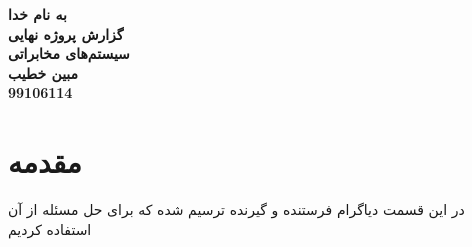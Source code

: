 

\begin{titlepage}
\begin{center}

\Huge
\textbf{به نام خدا}\\[2cm]

\huge
\textbf{گزارش پروژه نهایی }\\[0.5cm]
\textbf{سیستم‌های مخابراتی}\\[1.5cm]

\Large
\textbf{مبین خطیب}\\[0.3cm]
\textbf{99106114}\\[0.5cm]
\end{center}
\end{titlepage}

\newpage
\huge
\section{مقدمه}
\large
در این قسمت دیاگرام فرستنده و گیرنده ترسیم شده که برای حل مسئله از آن استفاده کردیم
